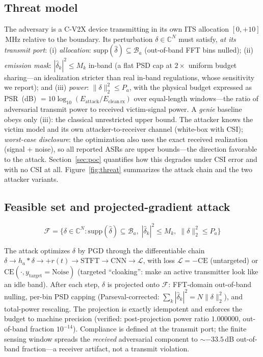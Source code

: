 \documentclass[review]{elsarticle}
\begin{document}
\subsection{Threat model}
\label{sec:threatmodel}

The adversary is a C-V2X device transmitting in its own ITS allocation
$[0,+10]$\,MHz relative to the boundary. Its perturbation $\delta \in
\mathbb{C}^{N}$ must satisfy, \emph{at its transmit port}:
(i) \emph{allocation}: $\mathrm{supp}(\hat{\delta}) \subseteq
\mathcal{B}_a$ (out-of-band FFT bins nulled);
(ii) \emph{emission mask}: $|\hat{\delta}_k|^2 \le M_k$ in-band (a flat PSD
cap at $2\times$ uniform budget sharing---an idealization stricter than real
in-band regulations, whose sensitivity we report); and
(iii) \emph{power}: $\|\delta\|_2^2 \le P_a$, with the physical budget
expressed as PSR~(dB) $= 10\log_{10}(E_{\mathrm{attack}} /
E_{\mathrm{clean\,rx}})$ over equal-length windows---the ratio of adversarial
transmit power to received victim-signal power. A \emph{genie} baseline
obeys only (iii): the classical unrestricted upper bound. The attacker knows
the victim model and its own attacker-to-receiver channel (white-box with
CSI); \emph{worst-case disclosure}: the optimization also uses the exact
received realization (signal + noise), so all reported ASRs are upper
bounds---the direction favorable to the attack. Section~\ref{sec:poc}
quantifies how this degrades under CSI error and with no CSI at all.
Figure~\ref{fig:threat} summarizes
the attack chain and the two attacker variants.

\subsection{Feasible set and projected-gradient attack}
\label{sec:pgd}

\begin{equation}
\mathcal{F} = \{\delta \in \mathbb{C}^{N} :
\mathrm{supp}(\hat{\delta}) \subseteq \mathcal{B}_a,\;
|\hat{\delta}_k|^2 \le M_k,\;
\|\delta\|_2^2 \le P_a \}
\label{eq:feasible}
\end{equation}

The attack optimizes $\delta$ by PGD through the differentiable chain
$\delta \rightarrow h_a \ast \delta \rightarrow + r(t) \rightarrow
\mathrm{STFT} \rightarrow \mathrm{CNN} \rightarrow \mathcal{L}$, with
loss $\mathcal{L} = -\mathrm{CE}$ (untargeted) or $\mathrm{CE}(\cdot,
y_{\mathrm{target}}=\mathrm{Noise})$ (targeted ``cloaking'': make an active
transmitter look like an idle band). After each step, $\delta$ is projected
onto $\mathcal{F}$: FFT-domain out-of-band nulling, per-bin PSD capping
(Parseval-corrected: $\sum_k |\hat{\delta}_k|^2 = N \|\delta\|_2^2$), and
total-power rescaling. The projection is exactly idempotent and enforces the
budget to machine precision (verified: post-projection power ratio
$1.000000$, out-of-band fraction $10^{-14}$). Compliance is defined at the
transmit port; the finite sensing window spreads the \emph{received}
adversarial component to ${\sim}-33.5$\,dB out-of-band fraction---a receiver
artifact, not a transmit violation.
\end{document}
